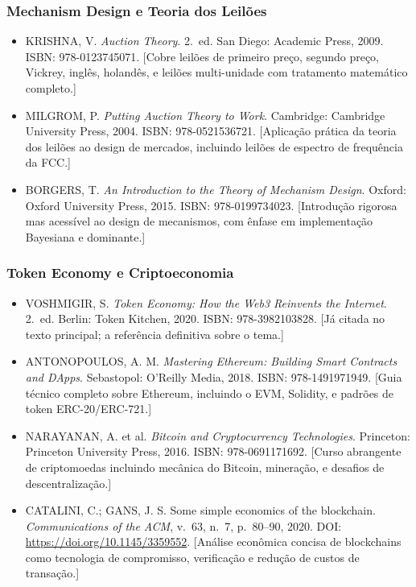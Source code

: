 \subsubsection*{Mechanism Design e Teoria dos Leilões}

\begin{itemize}
    \item KRISHNA, V. \textit{Auction Theory}. 2.~ed. San Diego: Academic Press, 2009. ISBN: 978-0123745071. [Cobre leilões de primeiro preço, segundo preço, Vickrey, inglês, holandês, e leilões multi-unidade com tratamento matemático completo.]
    
    \item MILGROM, P. \textit{Putting Auction Theory to Work}. Cambridge: Cambridge University Press, 2004. ISBN: 978-0521536721. [Aplicação prática da teoria dos leilões ao design de mercados, incluindo leilões de espectro de frequência da FCC.]
    
    \item BORGERS, T. \textit{An Introduction to the Theory of Mechanism Design}. Oxford: Oxford University Press, 2015. ISBN: 978-0199734023. [Introdução rigorosa mas acessível ao design de mecanismos, com ênfase em implementação Bayesiana e dominante.]
\end{itemize}

\subsubsection*{Token Economy e Criptoeconomia}

\begin{itemize}
    \item VOSHMIGIR, S. \textit{Token Economy: How the Web3 Reinvents the Internet}. 2.~ed. Berlin: Token Kitchen, 2020. ISBN: 978-3982103828. [Já citada no texto principal; a referência definitiva sobre o tema.]
    
    \item ANTONOPOULOS, A. M. \textit{Mastering Ethereum: Building Smart Contracts and DApps}. Sebastopol: O'Reilly Media, 2018. ISBN: 978-1491971949. [Guia técnico completo sobre Ethereum, incluindo o EVM, Solidity, e padrões de token ERC-20/ERC-721.]
    
    \item NARAYANAN, A. et al. \textit{Bitcoin and Cryptocurrency Technologies}. Princeton: Princeton University Press, 2016. ISBN: 978-0691171692. [Curso abrangente de criptomoedas incluindo mecânica do Bitcoin, mineração, e desafios de descentralização.]
    
    \item CATALINI, C.; GANS, J. S. Some simple economics of the blockchain. \textit{Communications of the ACM}, v.~63, n.~7, p.~80--90, 2020. DOI: \url{https://doi.org/10.1145/3359552}. [Análise econômica concisa de blockchains como tecnologia de compromisso, verificação e redução de custos de transação.]
\end{itemize}

